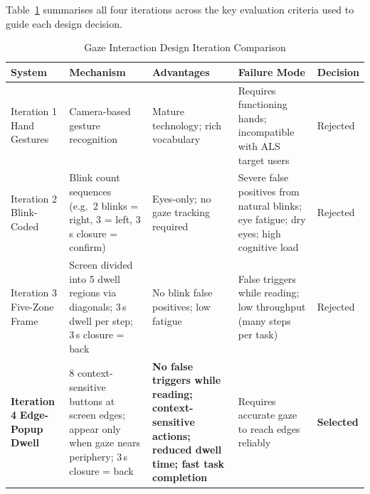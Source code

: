 
Table~\ref{tab:et_interaction_comparison} summarises all four iterations across the
key evaluation criteria used to guide each design decision.

\begin{table}[H]
\centering
\caption{Gaze Interaction Design Iteration Comparison}
\label{tab:et_interaction_comparison}
\begin{tabular}{p{2.8cm}p{3.2cm}p{2.6cm}p{3.2cm}p{1.6cm}}
\toprule
\textbf{System} & \textbf{Mechanism} & \textbf{Advantages} & \textbf{Failure Mode} & \textbf{Decision} \\
\midrule
Iteration 1 \newline Hand Gestures
  & Camera-based gesture recognition
  & Mature technology; rich vocabulary
  & Requires functioning hands; incompatible with ALS target users
  & Rejected \\[6pt]

Iteration 2 \newline Blink-Coded
  & Blink count sequences (e.g.\ 2 blinks = right, 3 = left, 3\,s closure = confirm)
  & Eyes-only; no gaze tracking required
  & Severe false positives from natural blinks; eye fatigue; dry eyes; high cognitive load
  & Rejected \\[6pt]

Iteration 3 \newline Five-Zone Frame
  & Screen divided into 5 dwell regions via diagonals; 3\,s dwell per step; 3\,s closure = back
  & No blink false positives; low fatigue
  & False triggers while reading; low throughput (many steps per task)
  & Rejected \\[6pt]

\textbf{Iteration 4} \newline \textbf{Edge-Popup Dwell}
  & 8 context-sensitive buttons at screen edges; appear only when gaze nears periphery; 3\,s closure = back
  & \textbf{No false triggers while reading; context-sensitive actions; reduced dwell time; fast task completion}
  & Requires accurate gaze to reach edges reliably
  & \textbf{Selected} \\
\bottomrule
\end{tabular}
\end{table}

